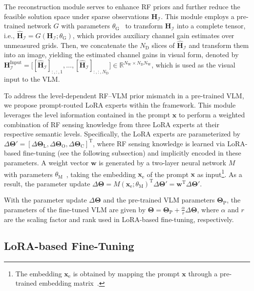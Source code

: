\documentclass[journal,12pt,onecolumn,draftclsnofoot]{IEEEtran}
\newcommand\IC{\ensuremath{\mathcal{I}}}
\newcommand\wB{\ensuremath{\bm{w}}}
\newcommand\xB{\ensuremath{\bm{x}}}
\newcommand\HF{\ensuremath{\mathbf{H}}}
\newcommand\CR{\ensuremath{\mathrm{C}}}
\newcommand\DR{\ensuremath{\mathrm{D}}}
\newcommand\GR{\ensuremath{\mathrm{G}}}
\newcommand\LR{\ensuremath{\mathrm{L}}}
\newcommand\MR{\ensuremath{\mathrm{M}}}
\newcommand\ROR{\ensuremath{\mathrm{O}}}
\newcommand\PR{\ensuremath{\mathrm{P}}}
\newcommand\TR{\ensuremath{\mathrm{T}}}
\newcommand\WR{\ensuremath{\mathrm{W}}}
\newcommand{\wh}{\widehat}
\begin{document}
The reconstruction module serves to enhance RF priors and further reduce the feasible solution space under sparse observations $\HF_{\IC}$. This module employs a pre-trained network $G$ with parameters $\theta_{\GR}$~\cite{hu2025advancing} to transform $\HF_{\IC}$ into a complete tensor, i.e., $\wh{\HF}_{\IC}=G(\HF_{\IC};\theta_{\GR})$, which provides auxiliary channel gain estimates over unmeasured grids. Then, we concatenate the $N_{\DR}$ slices of $\wh{\HF}_{\IC}$ and transform them into an image, yielding the estimated channel gains in visual form, denoted by $\HF_{\IC}^{\mathrm{Input}}=\big[[\wh{\HF}_{\IC}]_{:,:,1},\ldots,[\wh{\HF}_{\IC}]_{:,:,N_{\DR}}\big]\in\mathbb{R}^{N_{\WR}\times N_{\DR}N_{\WR}}$, which is used as the visual input to the VLM.

To address the level-dependent RF–VLM prior mismatch in a pre-trained VLM, we propose prompt-routed LoRA experts within the framework. This module leverages the level information contained in the prompt $\xB$ to perform a weighted combination of RF sensing knowledge from three LoRA experts at their respective semantic levels. Specifically, the LoRA experts are parameterized by $\Delta\mathbf{\Theta}'=[\Delta\mathbf{\Theta}_{\LR},\Delta\mathbf{\Theta}_{\ROR},\Delta\mathbf{\Theta}_{\CR}]^{\TR}$, where RF sensing knowledge is learned via LoRA-based fine-tuning (see the following subsection) and implicitly encoded in these parameters. A weight vector $\wB$ is generated by a two-layer neural network $M$ with parameters $\theta_{\MR}$~\cite{liu2024moe}, taking the embedding $\xB_{\mathrm{e}}$ of the prompt $\xB$ as input\footnote{The embedding $\xB_{\mathrm{e}}$ is obtained by mapping the prompt $\xB$ through a pre-trained embedding matrix~\cite{bai2025qwen2}.}. As a result, the parameter update $\Delta\mathbf{\Theta}=M(\xB_{\mathrm{e}};\theta_{\MR})^{\TR}\Delta\mathbf{\Theta}'=\wB^{\TR}\Delta\mathbf{\Theta}'$.  

With the parameter update  $\Delta\mathbf{\Theta}$ and the pre-trained VLM parameters $\mathbf{\Theta}_{\PR}$, the parameters of the fine-tuned VLM are given by $\mathbf{\Theta}=\mathbf{\Theta}_{\PR}+\frac{\alpha}{r}\Delta\mathbf{\Theta}$, where $\alpha$ and $r$ are the scaling factor and rank used in LoRA-based fine-tuning, respectively. 


\subsection{LoRA-based Fine-Tuning}
\end{document}
